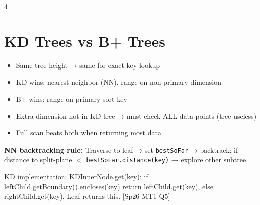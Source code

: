 \documentclass[8pt,letterpaper]{article}
\newcommand{\codefont}{\fontsize{4.2}{4.8}\selectfont\ttfamily}
\newcommand{\key}[1]{\textbf{\color{red!70!black}#1}}
\newcommand{\sql}[1]{{\codefont #1}}
\newcommand{\qref}[1]{{\fontsize{3.5}{4}\selectfont\color{purple!60!black}[#1]}}
\begin{document}
\begin{multicols*}{4}
\section{KD Trees vs B+ Trees}
\begin{itemize}
  \item Same tree height → same for exact key lookup
  \item KD wins: nearest-neighbor (NN), range on non-primary dimension
  \item B+ wins: range on primary sort key
  \item Extra dimension not in KD tree → must check ALL data points (tree useless)
  \item Full scan beats both when returning most data
\end{itemize}

\key{NN backtracking rule:} Traverse to leaf → set \texttt{bestSoFar} → backtrack: if distance to split-plane $<$ \texttt{bestSoFar.distance(key)} → explore other subtree.

\begin{ansbox}
KD implementation: \sql{KDInnerNode.get(key)}: if \sql{leftChild.getBoundary().encloses(key)} return \sql{leftChild.get(key)}, else \sql{rightChild.get(key)}. Leaf returns \sql{this}. \qref{Sp26 MT1 Q5}
\end{ansbox}

\end{multicols*}
\newpage
\end{document}
